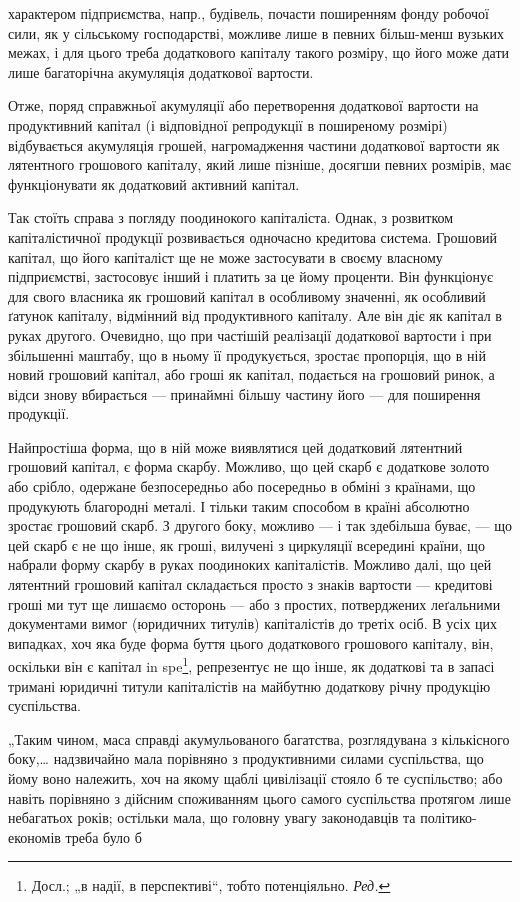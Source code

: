 \parcont{}  %
характером підприємства, напр., будівель, почасти поширенням фонду
робочої сили, як у сільському господарстві, можливе лише в певних
більш-менш вузьких межах, і для цього треба додаткового капіталу
такого розміру, що його може дати лише багаторічна акумуляція додаткової
вартости.

Отже, поряд справжньої акумуляції або перетворення додаткової
вартости на продуктивний капітал (і відповідної репродукції в поширеному
розмірі) відбувається акумуляція грошей, нагромадження частини додаткової
вартости як лятентного грошового капіталу, який лише пізніше,
досягши певних розмірів, має функціонувати як додатковий активний
капітал.

Так стоїть справа з погляду поодинокого капіталіста. Однак, з розвитком
капіталістичної продукції розвивається одночасно кредитова система.
Грошовий капітал, що його капіталіст ще не може застосувати в своєму
власному підприємстві, застосовує інший і платить за це йому проценти. Він
функціонує для свого власника як грошовий капітал в особливому
значенні, як особливий ґатунок капіталу, відмінний від продуктивного
капіталу. Але він діє як капітал в руках другого. Очевидно, що при
частішій реалізації додаткової вартости і при збільшенні маштабу, що
в ньому її продукується, зростає пропорція, що в ній новий грошовий
капітал, або гроші як капітал, подається на грошовий ринок, а відси
знову вбирається — принаймні більшу частину його — для поширення
продукції.

Найпростіша форма, що в ній може виявлятися цей додатковий лятентний
грошовий капітал, є форма скарбу. Можливо, що цей скарб є
додаткове золото або срібло, одержане безпосередньо або посередньо
в обміні з країнами, що продукують благородні металі. І тільки таким
способом в країні абсолютно зростає грошовий скарб. З другого боку,
можливо — і так здебільша буває, — що цей скарб є не що інше, як
гроші, вилучені з циркуляції всередині країни, що набрали форму скарбу
в руках поодиноких капіталістів. Можливо далі, що цей лятентний грошовий
капітал складається просто з знаків вартости — кредитові гроші
ми тут ще лишаємо осторонь — або з простих, потверджених леґальними
документами вимог (юридичних титулів) капіталістів до третіх осіб. В
усіх цих випадках, хоч яка буде форма буття цього додаткового грошового
капіталу, він, оскільки він є капітал in spe\footnote*{
Досл.; „в надії, в перспективі“, тобто потенціяльно. \emph{Ред.}
}, репрезентує не
що інше, як додаткові та в запасі тримані юридичні титули капіталістів на
майбутню додаткову річну продукцію суспільства.

„Таким чином, маса справді акумульованого багатства, розглядувана
з кількісного боку,\dots{} надзвичайно мала порівняно з продуктивними
силами суспільства, що йому воно належить, хоч на якому щаблі цивілізації
стояло б те суспільство; або навіть порівняно з дійсним споживанням
цього самого суспільства протягом лише небагатьох років; остільки
мала, що головну увагу законодавців та політико-економів треба було б
\parbreak{}  %
